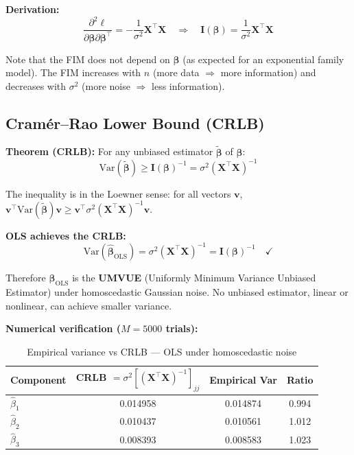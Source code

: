 \documentclass[12pt,a4paper]{article}
\begin{document}
\textbf{Derivation:}
\begin{equation}
    \frac{\partial^2\ell}{\partial\boldsymbol{\beta}\partial\boldsymbol{\beta}^\top}
    = -\frac{1}{\sigma^2}\mathbf{X}^\top\mathbf{X}
    \quad\Rightarrow\quad
    \mathbf{I}(\boldsymbol{\beta}) = \frac{1}{\sigma^2}\mathbf{X}^\top\mathbf{X}
\end{equation}

Note that the FIM does not depend on $\boldsymbol{\beta}$ (as expected for an exponential
family model). The FIM increases with $n$ (more data $\Rightarrow$ more information)
and decreases with $\sigma^2$ (more noise $\Rightarrow$ less information).

\subsection*{Cram\'{e}r--Rao Lower Bound (CRLB)}

\textbf{Theorem (CRLB):} For any unbiased estimator $\tilde{\boldsymbol{\beta}}$ of
$\boldsymbol{\beta}$:
\begin{equation}
    \mathrm{Var}(\tilde{\boldsymbol{\beta}}) \geq \mathbf{I}(\boldsymbol{\beta})^{-1}
    = \sigma^2(\mathbf{X}^\top\mathbf{X})^{-1}
\end{equation}

The inequality is in the Loewner sense: for all vectors $\mathbf{v}$,
$\mathbf{v}^\top\mathrm{Var}(\tilde{\boldsymbol{\beta}})\mathbf{v}
\geq \mathbf{v}^\top\sigma^2(\mathbf{X}^\top\mathbf{X})^{-1}\mathbf{v}$.

\textbf{OLS achieves the CRLB:}
\begin{equation}
    \mathrm{Var}(\hat{\boldsymbol{\beta}}_{\mathrm{OLS}})
    = \sigma^2(\mathbf{X}^\top\mathbf{X})^{-1}
    = \mathbf{I}(\boldsymbol{\beta})^{-1}
    \quad \checkmark
\end{equation}

Therefore $\hat{\boldsymbol{\beta}}_{\mathrm{OLS}}$ is the \textbf{UMVUE} (Uniformly Minimum
Variance Unbiased Estimator) under homoscedastic Gaussian noise. No unbiased
estimator, linear or nonlinear, can achieve smaller variance.

\textbf{Numerical verification ($M = 5000$ trials):}

\begin{table}[H]
\centering
\caption{Empirical variance vs CRLB --- OLS under homoscedastic noise}
\begin{tabular}{lccc}
\toprule
\textbf{Component} & \textbf{CRLB} $= \sigma^2[(\mathbf{X}^\top\mathbf{X})^{-1}]_{jj}$
                   & \textbf{Empirical Var} & \textbf{Ratio} \\
\midrule
$\hat{\beta}_1$ & 0.014958 & 0.014874 & 0.994 \\
$\hat{\beta}_2$ & 0.010437 & 0.010561 & 1.012 \\
$\hat{\beta}_3$ & 0.008393 & 0.008583 & 1.023 \\
\bottomrule
\end{tabular}
\end{table}
\end{document}
